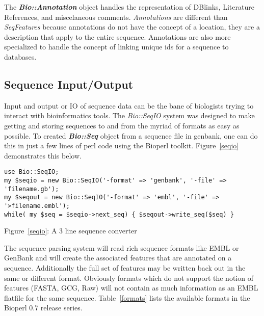\documentclass{article}
\begin{document}
\par
The \emph{\bf Bio::Annotation} object handles the representation of
DBlinks, Literature References, and miscelaneous comments.
\emph{Annotations} are different than \emph{SeqFeatures} because
annotations do not have the concept of a location, they are a
description that apply to the entire sequence.  Annotations are also
more specialized to handle the concept of linking unique ids for a
sequence to databases.

\subsection{Sequence Input/Output}

Input and output or IO of sequence data can be the bane of biologists
trying to interact with bioinformatics tools.  The \emph{Bio::SeqIO}
system was designed to make getting and storing sequences to and from
the myriad of formats as easy as possible.  To created \emph{\bf
Bio::Seq} object from a sequence file in genbank, one can do this in
just a few lines of perl code using the Bioperl toolkit.
Figure~\ref{seqio} demonstrates this below.

\begin{verbatim}
use Bio::SeqIO;
my $seqio = new Bio::SeqIO('-format' => 'genbank', '-file' => 'filename.gb');
my $seqout = new Bio::SeqIO('-format' => 'embl', '-file' => '>filename.embl');
while( my $seq = $seqio->next_seq) { $seqout->write_seq($seq) }
\end{verbatim}
\label{seqio}
\centerline{Figure~\ref{seqio}: A 3 line sequence converter}

\par The sequence parsing system will read rich sequence formats like
EMBL or GenBank and will create the associated features that are annotated
on a sequence.  Additionally the full set of features may be written
back out in the same or different format.  Obviously formats which do
not support the notion of features (FASTA, GCG, Raw) will not contain
as much information as an EMBL flatfile for the same sequence.
Table~\ref{formats} lists the available formats in the Bioperl 0.7
release series.
\end{document}
